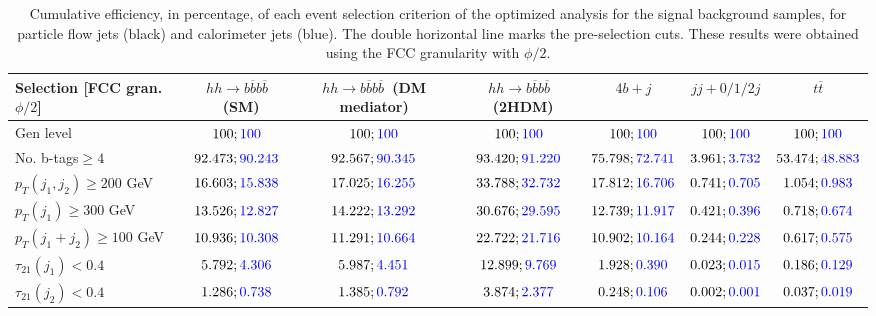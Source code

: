 \begin{landscape}
		\begin{table}
			\centering
			\caption{Cumulative efficiency, in percentage, of each event selection criterion of the optimized analysis for the signal background samples, for particle flow jets (black) and calorimeter jets (blue). The double horizontal line marks the pre-selection cuts. These results were obtained using the FCC granularity with $\phi/2$.}
			\begin{tabular}{lcccccc}
				\toprule 
				\textbf{Selection [FCC gran. $\phi/2$]} & $hh\rightarrow b\overline{b}b\overline{b}$~(SM) & $hh\rightarrow b\overline{b}b\overline{b}$~(DM mediator) & $hh\rightarrow b\overline{b}b\overline{b}$~(2HDM) & $4b+j$  & $jj+0/1/2 j$ & $t\overline{t}$ \\
				\midrule
				Gen level & $100;\textcolor{blue}{100}$ & $100;\textcolor{blue}{100}$ &$100;\textcolor{blue}{100}$& $100;\textcolor{blue}{100}$& $100;\textcolor{blue}{100}$& $100;\textcolor{blue}{100}$ \\
				\rowcolor{black!7}No. b-tags$\geq 4$&$92.473;\textcolor{blue}{90.243}$&$92.567;\textcolor{blue}{90.345}$&$93.420;\textcolor{blue}{91.220}$&$75.798;\textcolor{blue}{72.741}$&$3.961;\textcolor{blue}{3.732}$&$53.474;\textcolor{blue}{48.883}$\\
				$p_T(j_1,j_2)\geq200$ GeV & $16.603;\textcolor{blue}{15.838}$ & $17.025;\textcolor{blue}{16.255}$&$33.788;\textcolor{blue}{32.732}$ &$17.812;\textcolor{blue}{16.706}$&$0.741;\textcolor{blue}{0.705}$&$1.054;\textcolor{blue}{0.983}$\\ 
				\midrule \midrule
				\rowcolor{black!7}$p_T(j_1)\geq 300$ GeV & $13.526;\textcolor{blue}{12.827}$ &$14.222;\textcolor{blue}{13.292}$  &$30.676;\textcolor{blue}{29.595}$&$12.739;\textcolor{blue}{11.917}$&$0.421;\textcolor{blue}{0.396}$&$0.718;\textcolor{blue}{0.674}$\\ 
				$p_T(j_1+j_2)\geq 100$ GeV &$10.936;\textcolor{blue}{10.308}$ & $11.291;\textcolor{blue}{10.664}$ &$22.722;\textcolor{blue}{21.716}$&$10.902;\textcolor{blue}{10.164}$&$0.244;\textcolor{blue}{0.228}$&$0.617;\textcolor{blue}{0.575}$\\
				\rowcolor{black!7}$\tau_{21}(j_1)<0.4$ & $5.792;\textcolor{blue}{4.306}$& $5.987;\textcolor{blue}{4.451}$&$12.899;\textcolor{blue}{9.769}$&$1.928;\textcolor{blue}{0.390}$&$0.023;\textcolor{blue}{0.015}$&$0.186;\textcolor{blue}{0.129}$\\
				$\tau_{21}(j_2)<0.4$ &$1.286;\textcolor{blue}{0.738}$ &$1.385;\textcolor{blue}{0.792}$ &$3.874;\textcolor{blue}{2.377}$&$0.248;\textcolor{blue}{0.106}$&$0.002;\textcolor{blue}{0.001}$&$0.037;\textcolor{blue}{0.019}$\\

\end{tabular}
\end{table}
\end{landscape}
